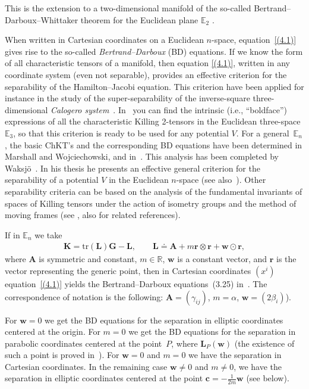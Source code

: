 \documentclass[10pt,a4paper]{amsart}
\def\bs{\boldsymbol}
\numberwithin{equation}{section}
\begin{document}
This is the extension to a two-dimensional manifold of the so-called Bertrand--Darboux--Whittaker theorem for the Euclidean plane $\mathbb E_2$ \cite{Ankiewicz-1983,Whittaker-1937}.

When written in Cartesian coordinates on a Euclidean $n$-space, equation~\eqref{(4.1)} gives rise to the so-called {\it Bertrand--Darboux} (BD) equations.
If we know the form of all characteristic tensors of a manifold, then equation \eqref{(4.1)}, written in any coordinate system (even not separable), provides an ef\/fective criterion for the separability of the Hamilton--Jacobi equation. This criterion have been applied for instance in the study of the super-separability of the inverse-square three-dimensional {\it Calogero system}~\cite{BCR-2000}. In~\cite{BCR-2000} you can f\/ind the intrinsic (i.e., ``boldface'') expressions of all the characteristic Killing 2-tensors in the Euclidean three-space $\mathbb E_3$, so that this criterion is ready to be used for any potential $V$. For a general~$\mathbb E_n$, the basic ChKT's and the corresponding BD equations have been determined in Marshall and Wojciechowski, and in~\cite{Benenti-1992b,Benenti-1993}. This analysis has been completed by Waksj\"o~\cite{Waksjo-2000}. In his thesis he presents an ef\/fective general criterion for the separability of a potential $V$ in the Euclidean $n$-space (see also~\cite{Waksjo-Rauch-Wojciechowski-2003}). Other separability criteria can be based on the analysis of the fundamental invariants of spaces of Killing tensors under the action of isometry groups and the method of moving frames (see \cite{DHMcLS-2004, McLenaghan-Smirnov-2002}, also for related references).

If in $\mathbb E_n$ we take
\begin{gather}
\bs K=\text{tr}(\bs L) \bs G-\bs L, \qquad
\bs L\doteq\bs A+ m \bs r\otimes\bs r + \bs w \odot \bs r,
\label{(4.2)}
\end{gather}
where $\bs A$ is symmetric and constant, $m\in\mathbb R$, $\bs w$ is a constant vector, and $\bs r$ is the vector representing the generic point,
then in Cartesian coordinates $(x^i)$ equation~\eqref{(4.1)} yields the Bertrand--Darboux equations~(3.25) in~\cite{Waksjo-2000}. The correspondence of notation is the following: $\bs A=(\gamma_{ij})$, $m=\alpha$, $\bs w =(2 \beta_i)$).

For $\bs w=0$ we get the BD equations for the separation in elliptic coordinates centered at the origin. For $m=0$ we get the BD equations for the separation in parabolic coordinates centered at the point~$P$, where $\bs L_P(\bs w)$ (the existence of such a point is proved in~\cite{Benenti-1992b}). For $\bs w=0$ and $m=0$ we have the separation in Cartesian coordinates. In the remaining case $\bs w\ne 0$ and $m\ne 0$, we have the separation in elliptic coordinates centered at the point $\bs c= -\tfrac 1{2m}\bs w$ (see below).
\end{document}
